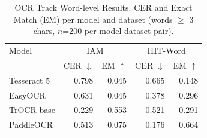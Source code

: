 \begin{table}[ht]
\centering
\small
\caption{OCR Track Word-level Results. CER and Exact Match (EM) per model and dataset (words $\geq$ 3 chars, $n$=200 per model-dataset pair).}
\label{tab:ocr_word_results}
\begin{tabular}{lrrrr}
\hline
Model & \multicolumn{2}{c}{IAM} & \multicolumn{2}{c}{IIIT-Word} \\
 & CER $\downarrow$ & EM $\uparrow$ & CER $\downarrow$ & EM $\uparrow$ \\
\hline
Tesseract 5 & 0.798 & 0.045 & 0.665 & 0.148 \\
EasyOCR & 0.631 & 0.045 & 0.378 & 0.296 \\
TrOCR-base & 0.229 & 0.553 & 0.521 & 0.291 \\
PaddleOCR & 0.513 & 0.075 & 0.176 & 0.664 \\
\hline
\end{tabular}
\end{table}
